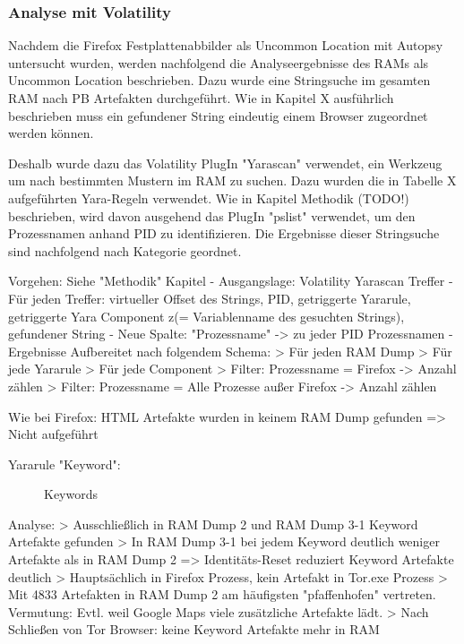\subsubsection*{Analyse mit Volatility}
			Nachdem die Firefox Festplattenabbilder als Uncommon Location mit Autopsy untersucht wurden, werden nachfolgend die Analyseergebnisse des RAMs als Uncommon Location beschrieben. 
			Dazu wurde eine Stringsuche im gesamten RAM nach PB Artefakten durchgeführt.
			Wie in Kapitel X ausführlich beschrieben muss ein gefundener String eindeutig einem Browser zugeordnet werden können. 
			
			Deshalb wurde dazu das Volatility PlugIn "Yarascan" verwendet, ein Werkzeug um nach bestimmten Mustern im RAM zu suchen. Dazu wurden die in Tabelle X aufgeführten Yara-Regeln verwendet.
			Wie in Kapitel Methodik (TODO!) beschrieben, wird davon ausgehend das PlugIn "pslist" verwendet, um den Prozessnamen anhand PID zu identifizieren.
			Die Ergebnisse dieser Stringsuche sind nachfolgend nach Kategorie geordnet.


Vorgehen: Siehe "Methodik" Kapitel
	- Ausgangslage: Volatility Yarascan Treffer
	- Für jeden Treffer: virtueller Offset des Strings, PID, getriggerte Yararule, getriggerte Yara Component z(= Variablenname des gesuchten Strings), gefundener String
	- Neue Spalte: "Prozessname" -> zu jeder PID Prozessnamen
	- Ergebnisse Aufbereitet nach folgendem Schema:
		> Für jeden RAM Dump
		> Für jede Yararule
		> Für jede Component
		> Filter: Prozessname = Firefox -> Anzahl zählen
		> Filter: Prozessname = Alle Prozesse außer Firefox -> Anzahl zählen

Wie bei Firefox: HTML Artefakte wurden in keinem RAM Dump gefunden => Nicht aufgeführt

Yararule "Keyword":
	\begin{figure}[h!]
		\centerline{}
		\label{chart:final-criteria}  
		\caption{Keywords}
	\end{figure}
	Analyse:
		> Ausschließlich in RAM Dump 2 und RAM Dump 3-1 Keyword Artefakte gefunden
		> In RAM Dump 3-1 bei jedem Keyword deutlich weniger Artefakte als in RAM Dump 2 => Identitäts-Reset reduziert Keyword Artefakte deutlich
		> Hauptsächlich in Firefox Prozess, kein Artefakt in Tor.exe Prozess
		> Mit 4833 Artefakten in RAM Dump 2 am häufigsten "pfaffenhofen" vertreten. Vermutung: Evtl. weil Google Maps viele zusätzliche Artefakte lädt. 
		> Nach Schließen von Tor Browser: keine Keyword Artefakte mehr in RAM
		
